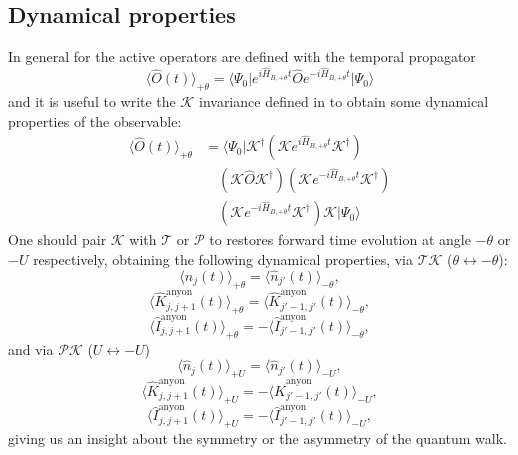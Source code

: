 \subsection{Dynamical properties}
In general for the active operators are defined with the temporal propagator
\begin{equation} 
\langle \hat{O}(t) \rangle_{+\theta} = \langle \Psi_0 \vert{} e^{i\hat{H}_{B,+\theta} t}  \hat{O} e^{-i\hat{H}_{B,+\theta} t} \vert{} \Psi_0 \rangle
\end{equation}
and it is useful to write the $\mathcal{K}$ invariance defined in \cite{PhysRevLett.121.250404} to obtain some dynamical properties of the observable: 	
\begin{equation}
\begin{split}
\langle \hat{O}(t) \rangle_{+\theta} &= \langle \Psi_0 \vert{} \mathcal{K}^\dagger \left( \mathcal{K} e^{i\hat{H}_{B,+\theta} t} \mathcal{K}^\dagger \right) \\
&\quad \left( \mathcal{K} \hat{O} \mathcal{K}^\dagger \right) \left( \mathcal{K} e^{-i\hat{H}_{B,+\theta} t} \mathcal{K}^\dagger \right) \\
&\quad  \left( \mathcal{K} e^{-i\hat{H}_{B,+\theta} t} \mathcal{K}^\dagger \right) \mathcal{K} \vert{} \Psi_0 \rangle 
\end{split}
\end{equation} 
One should pair $\mathcal{K}$ with $\mathcal{T}$ or $\mathcal{P}$ to restores forward time evolution at angle $-\theta$ or $-U$ respectively, obtaining the following dynamical properties, via $\mathcal{T}\mathcal{K}$ ($\theta \leftrightarrow -\theta$): 
\begin{equation} 
\langle \hat{n}_j(t) \rangle_{+\theta} = \langle \hat{n}_{j'}(t) \rangle_{-\theta}, 
\end{equation} 
\begin{equation} 
\langle \hat{K}_{j,j+1}^{\text{anyon}}(t) \rangle_{+\theta} = \langle \hat{K}_{j'-1,j'}^{\text{anyon}}(t) \rangle_{-\theta},
\end{equation} 
\begin{equation} 
\langle \hat{I}_{j,j+1}^{\text{anyon}}(t) \rangle_{+\theta} = -\langle \hat{I}_{j'-1,j'}^{\text{anyon}}(t) \rangle_{-\theta},
\end{equation} 
and via $\mathcal{P}\mathcal{K}$ ($U \leftrightarrow -U$)
\begin{equation} 
\langle \hat{n}_j(t) \rangle_{+U} = \langle \hat{n}_{j'}(t) \rangle_{-U},
\end{equation} 
\begin{equation} 
\langle \hat{K}_{j,j+1}^{\text{anyon}}(t) \rangle_{+U} = -\langle \hat{K}_{j'-1,j'}^{\text{anyon}}(t) \rangle_{-U},
\end{equation} 
\begin{equation} 
\langle \hat{I}_{j,j+1}^{\text{anyon}}(t) \rangle_{+U} = -\langle \hat{I}_{j'-1,j'}^{\text{anyon}}(t) \rangle_{-U},
\end{equation} 
giving us an insight about the symmetry or the asymmetry of the quantum walk.
